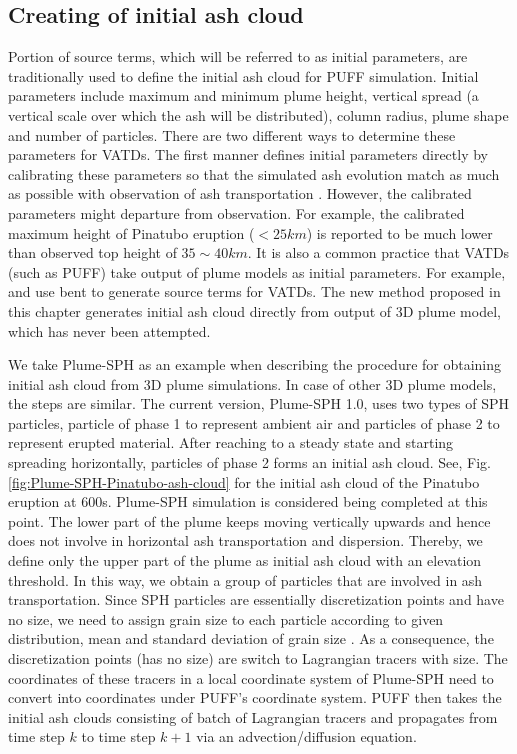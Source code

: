 \subsection{Creating of initial ash cloud}

Portion of source terms, which will be referred to as initial parameters, are traditionally used to define the initial ash cloud for PUFF simulation. Initial parameters include maximum and minimum plume height, vertical spread (a vertical scale over which the ash will be distributed), column radius, plume shape and number of particles. There are two different ways to determine these parameters for VATDs. The first manner defines initial parameters directly by calibrating these parameters so that the simulated ash evolution match as much as possible with observation of ash transportation \citep[e.g.][]{fero2008simulation,fero2009simulating}. However, the calibrated parameters might departure from observation. For example, the calibrated maximum height of Pinatubo eruption ($<25 km$) is reported to be much lower \citep{fero2009simulating} than observed top height of $35 \sim 40 km$. It is also a common practice that VATDs (such as PUFF) take output of plume models as initial parameters. For example, \citet{bursik2012estimation} and \citet{ stefanescu2014temporal} use bent \citep{bursik2001effect} to generate source terms for VATDs. The new method proposed in this chapter generates initial ash cloud directly from output of 3D plume model, which has never been attempted.

We take Plume-SPH as an example when describing the procedure for obtaining initial ash cloud from 3D plume simulations. In case of other 3D plume models, the steps are similar. The current version, Plume-SPH 1.0, uses two types of SPH particles, particle of phase 1 to represent ambient air and particles of phase 2 to represent erupted material. After reaching to a steady state and starting spreading horizontally, particles of phase 2 forms an initial ash cloud. See, Fig. \ref{fig:Plume-SPH-Pinatubo-ash-cloud} for the initial ash cloud of the Pinatubo eruption at 600s. Plume-SPH simulation is considered being completed at this point. The lower part of the plume keeps moving vertically upwards and hence does not involve in horizontal ash transportation and dispersion. Thereby, we define only the upper part of the plume as initial ash cloud with an elevation threshold. In this way, we obtain a group of particles that are involved in ash transportation. Since SPH particles are essentially discretization points and have no size, we need to assign grain size to each particle according to given distribution, mean and standard deviation of grain size \citep{paladio1996tephra}. As a consequence, the discretization points (has no size) are switch to Lagrangian tracers with size. The coordinates of these tracers in a local coordinate system of Plume-SPH need to convert into coordinates under PUFF's coordinate system. PUFF then takes the initial ash clouds consisting of batch of Lagrangian tracers and propagates from time step $k$ to time step $k+1$ via an advection/diffusion equation.

